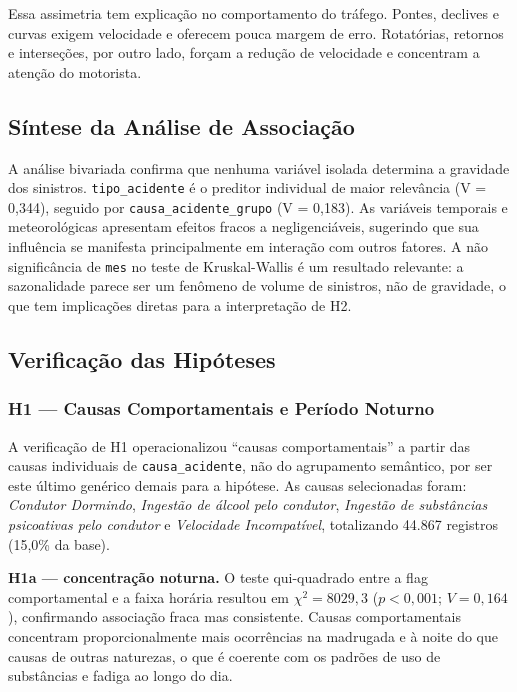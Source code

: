 \documentclass[12pt]{article}
\begin{document}
Essa assimetria tem explicação no comportamento do tráfego.
Pontes, declives e curvas exigem velocidade e oferecem pouca
margem de erro. Rotatórias, retornos e interseções, por outro lado,
forçam a redução de velocidade e concentram a atenção do motorista.

\subsection{Síntese da Análise de Associação}

A análise bivariada confirma que nenhuma variável isolada determina
a gravidade dos sinistros. \texttt{tipo\_acidente} é o preditor
individual de maior relevância (V = 0,344), seguido por
\texttt{causa\_acidente\_grupo} (V = 0,183). As variáveis temporais
e meteorológicas apresentam efeitos fracos a negligenciáveis,
sugerindo que sua influência se manifesta principalmente em
interação com outros fatores. A não significância de \texttt{mes}
no teste de Kruskal-Wallis é um resultado relevante: a sazonalidade
parece ser um fenômeno de volume de sinistros, não de gravidade,
o que tem implicações diretas para a interpretação de H2.

\subsection{Verificação das Hipóteses}

\subsubsection{H1 --- Causas Comportamentais e Período Noturno}

A verificação de H1 operacionalizou ``causas comportamentais'' a partir
das causas individuais de \texttt{causa\_acidente}, não do agrupamento
semântico, por ser este último genérico demais para a hipótese. As
causas selecionadas foram: \textit{Condutor Dormindo}, \textit{Ingestão
de álcool pelo condutor}, \textit{Ingestão de substâncias psicoativas
pelo condutor} e \textit{Velocidade Incompatível}, totalizando 44.867
registros (15,0\% da base).

\textbf{H1a --- concentração noturna.} O teste qui-quadrado entre a
flag comportamental e a faixa horária resultou em $\chi^2 = 8029{,}3$
($p < 0{,}001$; $V = 0{,}164$), confirmando associação fraca mas
consistente. Causas comportamentais concentram proporcionalmente mais
ocorrências na madrugada e à noite do que causas de outras naturezas,
o que é coerente com os padrões de uso de substâncias e fadiga ao
longo do dia.
\end{document}
